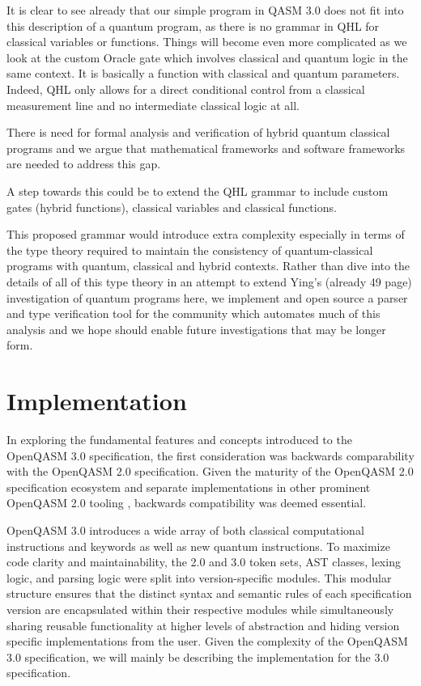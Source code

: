 \documentclass{article}
\begin{document}
It is clear to see already that our simple program in QASM 3.0 does not fit into this description of a quantum program, as there is no grammar in QHL for classical variables or functions. Things will become even more complicated as we look at the custom Oracle gate which involves classical and quantum logic in the same context. It is basically a function with classical and quantum parameters. Indeed, QHL only allows for a direct conditional control from a classical measurement line and no intermediate classical logic at all.

There is need for formal analysis and verification of hybrid quantum classical programs and we argue that mathematical frameworks and software frameworks are needed to address this gap.

A step towards this could be to extend the QHL grammar to include custom gates (hybrid functions), classical variables and classical functions.

This proposed grammar would introduce extra complexity especially in terms of the type theory required to maintain the consistency of quantum-classical programs with quantum, classical and hybrid contexts. Rather than dive into the details of all of this type theory in an attempt to extend Ying's (already 49 page) investigation of quantum programs here, we implement and open source a parser and type verification tool for the community which automates much of this analysis and we hope should enable future investigations that may be longer form.

\section{Implementation}

In exploring the fundamental features and concepts introduced to the OpenQASM 3.0 specification, the first consideration was backwards comparability with the OpenQASM 2.0 specification. Given the maturity of the OpenQASM 2.0 specification ecosystem and separate implementations in other prominent OpenQASM 2.0 tooling \cite{noauthor_qiskit_openqasm2_nodate}, backwards compatibility was deemed essential. 

OpenQASM 3.0 introduces a wide array of both classical computational instructions and keywords as well as new quantum instructions. To maximize code clarity and maintainability, the 2.0 and 3.0 token sets, AST classes, lexing logic, and parsing logic were split into version-specific modules. This modular structure ensures that the distinct syntax and semantic rules of each specification version are encapsulated within their respective modules while simultaneously sharing reusable functionality at higher levels of abstraction and hiding version specific implementations from the user. Given the complexity of the OpenQASM 3.0 specification, we will mainly be describing the implementation for the 3.0 specification.
\end{document}
